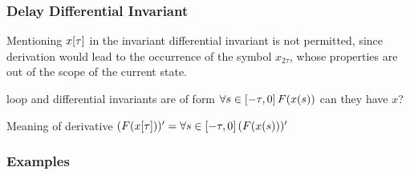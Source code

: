 \documentclass[10pt]{report}
\begin{document}
        \subsubsection{Delay Differential Invariant}
            \label{sec:delay-differential-invariant}

            Mentioning $\xtau$ in the invariant differential invariant is not permitted, since derivation would lead to the occurrence of the symbol $x_{2\tau}$, whose properties are out of the scope of the current state.

            loop and differential invariants are of form $\forall s\in[-\tau,0]{\,} F(x(s))$
            can they have $x$?

            Meaning of derivative $(F(\xtau))'=\lforall{s\in[-\tau,0]}{(F(x(s)))'}$

        \subsubsection{Examples}
            \label{sec:examples}
\end{document}
